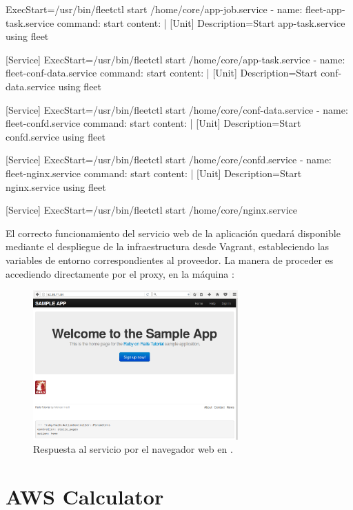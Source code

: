 \begin{codelisting}
\begin{code}
      [Service]
      ExecStart=/usr/bin/fleetctl start /home/core/app-job.service
  - name: fleet-app-task.service
    command: start
    content: |
      [Unit]
      Description=Start app-task.service using fleet

      [Service]
      ExecStart=/usr/bin/fleetctl start /home/core/app-task.service
  - name: fleet-conf-data.service
    command: start
    content: |
      [Unit]
      Description=Start conf-data.service using fleet

      [Service]
      ExecStart=/usr/bin/fleetctl start /home/core/conf-data.service
  - name: fleet-confd.service
    command: start
    content: |
      [Unit]
      Description=Start confd.service using fleet

      [Service]
      ExecStart=/usr/bin/fleetctl start /home/core/confd.service
  - name: fleet-nginx.service
    command: start
    content: |
      [Unit]
      Description=Start nginx.service using fleet

      [Service]
      ExecStart=/usr/bin/fleetctl start /home/core/nginx.service
\end{code}
\end{codelisting}

El correcto funcionamiento del servicio web de la aplicación quedará disponible mediante el despliegue de la infraestructura desde Vagrant, estableciendo las variables de entorno correspondientes al proveedor. La manera de proceder es accediendo directamente por el proxy, en la máquina :


\begin{figure}[H]
\centering
\includegraphics[width=0.7\textwidth]{images/figures/web-confd.png}
\caption{Respuesta al servicio por el navegador web en .}
\end{figure}

\section{AWS Calculator}
